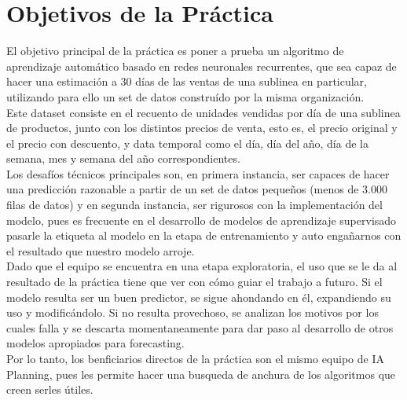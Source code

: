 \documentclass[12pt]{article}
\begin{document}
\section{Objetivos de la Práctica}
El objetivo principal de la práctica es poner a prueba un algoritmo de aprendizaje automático basado en redes neuronales recurrentes, que sea capaz de hacer una estimación a 30 días de las ventas de una sublinea en particular, utilizando para ello un set de datos construído por la misma organización. \\ Este dataset consiste en el recuento de unidades vendidas por día de una sublinea de productos, junto con los distintos precios de venta, esto es, el precio original y el precio con descuento, y data temporal como el día, día del año, día de la semana, mes y semana del año correspondientes. \\
Los desafíos técnicos principales son, en primera instancia, ser capaces de hacer una predicción razonable a partir de un set de datos pequeños (menos de 3.000 filas de datos) y en segunda instancia, ser rigurosos con la implementación del modelo, pues es frecuente en el desarrollo de modelos de aprendizaje supervisado pasarle la etiqueta al modelo en la etapa de entrenamiento y auto engañarnos con el resultado que nuestro modelo arroje.\\

Dado que el equipo se encuentra en una etapa exploratoria, el uso que se le da al resultado de la práctica tiene que ver con cómo guiar el trabajo a futuro. Si el modelo resulta ser un buen predictor, se sigue ahondando en él, expandiendo su uso y modificándolo. Si no resulta provechoso, se analizan los motivos por los cuales falla y se descarta momentaneamente para dar paso al desarrollo de otros modelos apropiados para forecasting.\\

Por lo tanto, los benficiarios directos de la práctica son el mismo equipo de IA Planning, pues les permite hacer una busqueda de anchura de los algoritmos que creen serles útiles.
\end{document}

